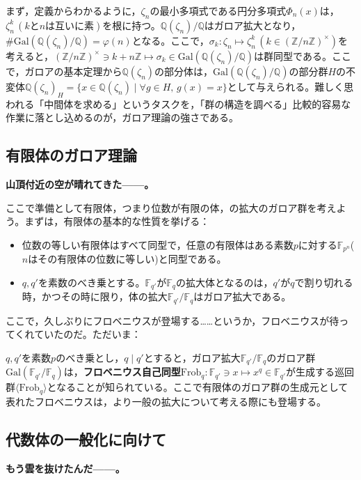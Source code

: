 まず，定義からわかるように，$\zeta_n$の最小多項式である円分多項式$\Phi_n(x)$は，$\zeta_n^k\,(k\text{と}n\text{は互いに素})$を根に持つ。$\mathds{Q}(\zeta_n)/{\mathds{Q}}$はガロア拡大となり，$\#\mathrm{Gal}(\mathds{Q}(\zeta_n)/{\mathds{Q}})=\varphi(n)$となる。ここで，$\sigma_k\colon\zeta_n\mapsto\zeta_n^k\, (k\in (\mathds{Z}/{n\mathds{Z}})^{\times})$を考えると，$(\mathds{Z}/{n\mathds{Z}})^{\times}\ni k+n\mathds{Z}\mapsto\sigma_k\in\mathrm{Gal}(\mathds{Q}(\zeta_n)/{\mathds{Q}})$は群同型である。ここで，ガロアの基本定理から$\mathds{Q}(\zeta_n)$の部分体は，$\mathrm{Gal}(\mathds{Q}(\zeta_n)/{\mathds{Q}})$の部分群$H$の不変体$\mathds{Q}(\zeta_n)_H=\{x\in\mathds{Q}(\zeta_n)\mid\forall g\in H,\, g(x)=x\}$として与えられる。難しく思われる「中間体を求める」というタスクを，「群の構造を調べる」比較的容易な作業に落とし込めるのが，ガロア理論の強さである。

\subsection{有限体のガロア理論}
\textbf{山頂付近の空が晴れてきた------。}

\vspace{10pt}

ここで準備として有限体，つまり位数が有限の体，の拡大のガロア群を考えよう。まずは，有限体の基本的な性質を挙げる：
\begin{itemize}
    \item 位数の等しい有限体はすべて同型で，任意の有限体はある素数$p$に対する$\mathds{F}_{p^n}$($n$はその有限体の位数に等しい)と同型である。
    \item $q,q'$を素数のべき乗とする。$\mathds{F}_{q'}$が$\mathds{F}_{q}$の拡大体となるのは，$q'$が$q$で割り切れる時，かつその時に限り，体の拡大$\mathds{F}_{q'}/{\mathds{F}_q}$はガロア拡大である。
\end{itemize}
ここで，久しぶりにフロベニウスが登場する\dots\dots というか，フロベニウスが待ってくれていたのだ。ただいま：

$q,q'$を素数$p$のべき乗とし，$q\mid q'$とすると，ガロア拡大$\mathds{F}_{q'}/{\mathds{F}_q}$のガロア群$\mathrm{Gal}(\mathds{F}_{q'}/{\mathds{F}_q})$は，\textbf{フロベニウス自己同型}$\mathrm{Frob}_q\colon\mathds{F}_{q'}\ni x\mapsto x^q\in\mathds{F}_{q'}$が生成する巡回群$\langle\mathrm{Frob}_q\rangle$となることが知られている。ここで有限体のガロア群の生成元として表れたフロベニウスは，より一般の拡大について考える際にも登場する。

\subsection{代数体の一般化に向けて}\label{ippanka}
\textbf{もう雲を抜けたんだ------。}

